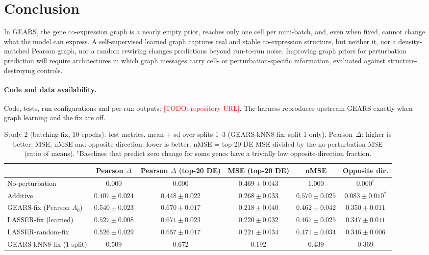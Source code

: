 \documentclass[11pt]{article}
\newcommand{\todo}[1]{\textcolor{red}{[TODO: #1]}}
\newcommand{\GEARS}{\textsc{GEARS}}
\begin{document}
\section{Conclusion}
In \GEARS{}, the gene co-expression graph is a nearly empty prior, reaches only one cell per mini-batch, and, even
when fixed, cannot change what the model can express. A self-supervised learned graph captures real and stable
co-expression structure, but neither it, nor a density-matched Pearson graph, nor a random rewiring changes
predictions beyond run-to-run noise. Improving graph priors for perturbation prediction will require architectures
in which graph messages carry cell- or perturbation-specific information, evaluated against structure-destroying
controls.

\paragraph{Code and data availability.} Code, tests, run configurations and per-run outputs:
\todo{repository URL}. The harness reproduces upstream \GEARS{} exactly when graph learning and the fix are off.

\begin{table}[t]
\centering
\caption{Study 2 (batching fix, 10 epochs): test metrics, mean $\pm$ sd over splits 1--3 (GEARS-kNN8-fix: split 1
only). Pearson~$\Delta$: higher is better; MSE, nMSE and opposite direction: lower is better. nMSE = top-20 DE MSE
divided by the no-perturbation MSE (ratio of means). $^\dagger$Baselines that predict zero change for some genes
have a trivially low opposite-direction fraction.}
\label{tab:main}
\small
\begin{tabular}{lccccc}
\toprule
 & Pearson $\Delta$ & Pearson $\Delta$ (top-20 DE) & MSE (top-20 DE) & nMSE & Opposite dir.\\
\midrule
No-perturbation & 0.000 & 0.000 & $0.469\pm0.043$ & 1.000 & $0.000^\dagger$\\
Additive & $0.407\pm0.024$ & $0.448\pm0.022$ & $0.268\pm0.033$ & $0.570\pm0.025$ & $0.083\pm0.010^\dagger$\\
\midrule
GEARS-fix (Pearson $A_0$) & $0.540\pm0.023$ & $0.670\pm0.017$ & $0.218\pm0.040$ & $0.462\pm0.042$ & $0.350\pm0.011$\\
LASSER-fix (learned) & $0.527\pm0.008$ & $0.671\pm0.023$ & $0.220\pm0.032$ & $0.467\pm0.025$ & $0.347\pm0.011$\\
LASSER-random-fix & $0.526\pm0.029$ & $0.657\pm0.017$ & $0.221\pm0.034$ & $0.471\pm0.034$ & $0.346\pm0.006$\\
GEARS-kNN8-fix (1 split) & 0.509 & 0.672 & 0.192 & 0.439 & 0.369\\
\bottomrule
\end{tabular}
\end{table}
\end{document}
